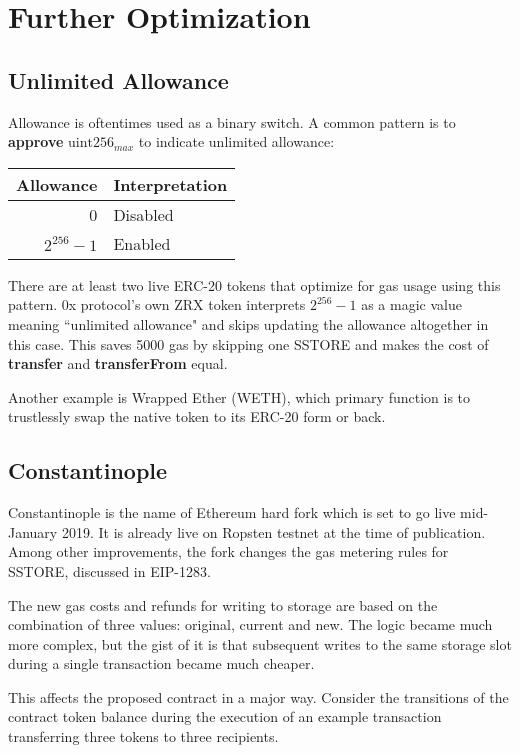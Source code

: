 \documentclass[12pt]{article}
\begin{document}
\section{Further Optimization}

\subsection{Unlimited Allowance}
Allowance is oftentimes used as a binary switch.
A common pattern is to \textbf{approve} $\text{uint256}_{max}$ to indicate unlimited allowance:

\begin{center}	
\begin{tabular}{r l}
Allowance & Interpretation \\ \midrule
0 & Disabled  \\
$2^{256}-1$ & Enabled
\end{tabular}
\end{center}

There are at least two live ERC-20 tokens that optimize for gas usage using this pattern.
0x protocol's own ZRX token interprets $2^{256}-1$ as a magic value meaning ``unlimited allowance" and skips updating the allowance altogether in this case\cite{zrx-unlimited}.
This saves 5000 gas by skipping one SSTORE and makes the cost of \textbf{transfer} and \textbf{transferFrom} equal.

Another example is Wrapped Ether (WETH), which primary function is to trustlessly swap the native token to its ERC-20 form or back.

\subsection{Constantinople}

Constantinople is the name of Ethereum hard fork which is set to go live mid-January 2019.
It is already live on Ropsten testnet at the time of publication.
Among other improvements, the fork changes the gas metering rules for SSTORE,
discussed in EIP-1283\cite{eip1283}.

The new gas costs and refunds for writing to storage are based on the combination of three values: original, current and new.
The logic became much more complex, but the gist of it is that subsequent writes to the same storage slot during a single transaction became much cheaper.

This affects the proposed contract in a major way.
Consider the transitions of the contract token balance during the execution of an example transaction transferring three tokens to three recipients.
\end{document}
